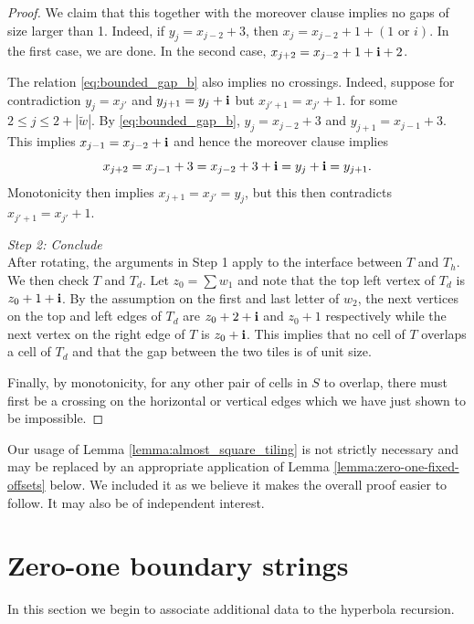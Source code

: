 \documentclass[12pt]{amsart}
\begin{document}
\begin{proof}
	We claim that this together with the moreover clause implies no gaps of size larger than 1. Indeed, if $y_j = x_{j-2} + 3$, then 
	$x_{j} = x_{j-2} + 1 + (1 \mbox{ or } i)$. In the first case, we are done. In the second case, $x_{j+2} = x_{j-2} + 1 + \mathbf{i} + 2$. 
	
	The relation \eqref{eq:bounded_gap_b} also implies no crossings. Indeed, suppose for contradiction $y_{j} = x_{j'}$ and $y_{j+1} = y_j + \mathbf{i}$
	but $x_{j'+1} = x_{j'} + 1$. 
	for some $2 \leq j \leq 2 + |\tilde{w}|$. By \eqref{eq:bounded_gap_b}, $y_{j} = x_{j-2} + 3$ and $y_{j+1} = x_{j-1} + 3$. This 
	implies $x_{j-1} = x_{j-2} + \mathbf{i}$ and hence the moreover clause implies 
	\[
	x_{j+2} = x_{j-1} + 3 = x_{j-2} + 3 + \mathbf{i} = y_{j} + \mathbf{i} = y_{j+1}.
	\]
	Monotonicity then implies $x_{j+1} = x_{j'} = y_j$, but this then contradicts $x_{j'+1} = x_{j'} + 1$.  

	
	
	
	{\it Step 2: Conclude} \\
	After rotating, the arguments in Step 1 apply to the interface between $T$ and $T_h$.  We then check $T$ and $T_d$. Let $z_0 = \sum w_1$ and note that the top left vertex of $T_{d}$ is $z_0 + 1 + \mathbf{i}$. By the assumption on the first and last letter of $w_2$, the next vertices on the top and left edges of $T_{d}$ are $z_0 + 2 + \mathbf{i}$ and $z_0 + 1$ respectively while the next vertex on the right edge of $T$ is $z_0 + \mathbf{i}$. 
	This implies that no cell of $T$ overlaps a cell of $T_d$ and that the gap between the two tiles is of unit size. 
	
	Finally, by monotonicity, for any other pair of cells in $S$ to overlap, there must first be a crossing on the horizontal or vertical edges which we have just shown to be impossible. 	
\end{proof}

\begin{remark}
	Our usage of Lemma \ref{lemma:almost_square_tiling} is not strictly necessary and may be replaced by an appropriate application of Lemma \ref{lemma:zero-one-fixed-offsets}
	below. We included it as we believe it makes the overall proof easier to follow. It may also be of independent interest.
\end{remark}




\section{Zero-one boundary strings} \label{sec:zero-one_strings}
In this section we begin to associate additional data to the hyperbola recursion.
 
\end{document}
